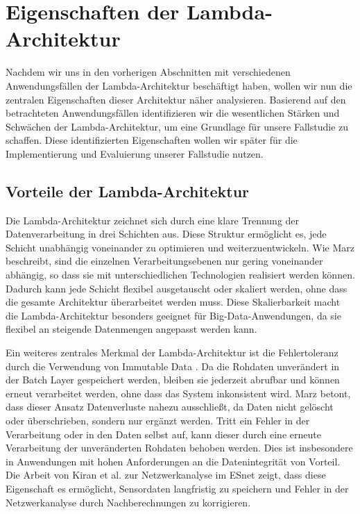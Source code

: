 \section{Eigenschaften der Lambda-Architektur}
Nachdem wir uns in den vorherigen Abschnitten mit verschiedenen Anwendungsfällen der Lambda-Architektur beschäftigt haben, wollen wir nun die zentralen Eigenschaften dieser Architektur näher analysieren. Basierend auf den betrachteten Anwendungsfällen identifizieren wir die wesentlichen Stärken und Schwächen der Lambda-Architektur, um eine Grundlage für unsere Fallstudie zu schaffen. Diese identifizierten Eigenschaften wollen wir später für die Implementierung und Evaluierung unserer Fallstudie nutzen.

\subsection{Vorteile der Lambda-Architektur}
Die Lambda-Architektur zeichnet sich durch eine klare Trennung der Datenverarbeitung in drei Schichten aus. Diese Struktur ermöglicht es, jede Schicht unabhängig voneinander zu optimieren und weiterzuentwickeln. Wie Marz \cite{warren2015big} beschreibt, sind die einzelnen Verarbeitungsebenen nur gering voneinander abhängig, so dass sie mit unterschiedlichen Technologien realisiert werden können. Dadurch kann jede Schicht flexibel ausgetauscht oder skaliert werden, ohne dass die gesamte Architektur überarbeitet werden muss. Diese Skalierbarkeit macht die Lambda-Architektur besonders geeignet für Big-Data-Anwendungen, da sie flexibel an steigende Datenmengen angepasst werden kann.

Ein weiteres zentrales Merkmal der Lambda-Architektur ist die Fehlertoleranz durch die Verwendung von Immutable Data \cite{warren2015big}. Da die Rohdaten unverändert in der Batch Layer gespeichert werden, bleiben sie jederzeit abrufbar und können erneut verarbeitet werden, ohne dass das System inkonsistent wird. Marz \cite{warren2015big} betont, dass dieser Ansatz Datenverluste nahezu ausschließt, da Daten nicht gelöscht oder überschrieben, sondern nur ergänzt werden. Tritt ein Fehler in der Verarbeitung oder in den Daten selbst auf, kann dieser durch eine erneute Verarbeitung der unveränderten Rohdaten behoben werden. Dies ist insbesondere in Anwendungen mit hohen Anforderungen an die Datenintegrität von Vorteil. Die Arbeit von Kiran et al. \cite{kiran2015lambda} zur Netzwerkanalyse im ESnet zeigt, dass diese Eigenschaft es ermöglicht, Sensordaten langfristig zu speichern und Fehler in der Netzwerkanalyse durch Nachberechnungen zu korrigieren.

